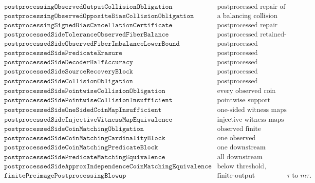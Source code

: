 \documentclass[11pt]{article}
\theoremstyle{remark}
\begin{document}
\[\begin{array}{ll}
\texttt{postprocessingObservedOutputCollisionObligation}
  & \text{postprocessed repair of imbalance must collide observed outputs,}\\
\texttt{postprocessingObservedOppositeBiasCollisionObligation}
  & \text{a balancing collision must merge opposite source-bias outputs,}\\
\texttt{postprocessingSignedBiasCancellationCertificate}
  & \text{postprocessed repair requires zero signed bias in each merged fiber,}\\
\texttt{postprocessedSideToleranceObservedFiberBalance}
  & \text{postprocessed retained-side tolerance collapses to observed balance,}\\
\texttt{postprocessedSideObservedFiberImbalanceLowerBound}
  & \text{postprocessed observed-fiber imbalance forces tolerance budget,}\\
\texttt{postprocessedSidePredicateErasure}
  & \text{postprocessed downstream predicates have equal side counts,}\\
\texttt{postprocessedSideDecoderHalfAccuracy}
  & \text{postprocessed downstream decoders are half-accurate below threshold,}\\
\texttt{postprocessedSideSourceRecoveryBlock}
  & \text{postprocessed downstream source recovery is blocked below threshold,}\\
\texttt{postprocessedSideCollisionObligation}
  & \text{postprocessed independence forces true/false observed overlap,}\\
\texttt{postprocessedSidePointwiseCollisionObligation}
  & \text{every observed coin value is witnessed on both source sides,}\\
\texttt{postprocessedSidePointwiseCollisionInsufficient}
  & \text{pointwise support overlap need not provide coin matching,}\\
\texttt{postprocessedSideOneSidedCoinMapInsufficient}
  & \text{one-sided witness maps need injectivity/bijectivity,}\\
\texttt{postprocessedSideInjectiveWitnessMapEquivalence}
  & \text{injective witness maps are exactly coin matching,}\\
\texttt{postprocessedSideCoinMatchingObligation}
  & \text{observed finite multiplicities support a preserving coin bijection,}\\
\texttt{postprocessedSideCoinMatchingCardinalityBlock}
  & \text{one observed multiplicity mismatch blocks that coin matching,}\\
\texttt{postprocessedSideCoinMatchingPredicateBlock}
  & \text{one downstream predicate mismatch blocks that coin matching,}\\
\texttt{postprocessedSidePredicateMatchingEquivalence}
  & \text{all downstream predicates neutral iff coin matching exists,}\\
\texttt{postprocessedSideApproxIndependenceCoinMatchingEquivalence}
  & \text{below threshold, approximate independence iff coin matching exists,}\\
\texttt{finitePreimagePostprocessingBlowup}
  & \text{finite-output postprocessing changes }\tau\text{ to }m\tau.
\end{array}
\]
\end{document}
